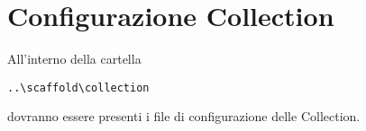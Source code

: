 \section{Configurazione Collection}

All'interno della cartella \begin{lstlisting}
..\scaffold\collection
 \end{lstlisting} dovranno essere presenti i file di configurazione delle Collection.






